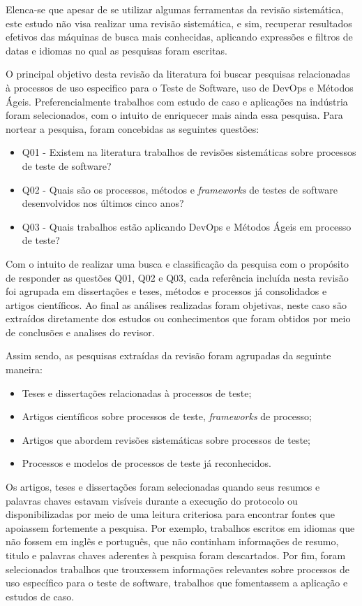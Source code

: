 Elenca-se que apesar de se utilizar algumas ferramentas da revisão sistemática, este estudo não visa realizar uma revisão sistemática, e sim, recuperar resultados efetivos das máquinas de busca mais conhecidas, aplicando expressões e filtros de datas e idiomas no qual as pesquisas foram escritas. 

O principal objetivo desta revisão da literatura foi buscar pesquisas relacionadas à processos de uso especifico para o Teste de Software, uso de DevOps e Métodos Ágeis. Preferencialmente trabalhos com estudo de caso e aplicações na indústria foram selecionados, com o intuito de enriquecer mais ainda essa pesquisa. Para nortear a pesquisa, foram concebidas as seguintes questões:

\begin{itemize}
\item Q01 - Existem na literatura trabalhos de revisões sistemáticas sobre processos de teste de software?   
\item Q02 - Quais são os processos, métodos e \textit{frameworks} de testes de software desenvolvidos nos últimos cinco anos?
\item Q03 - Quais trabalhos estão aplicando DevOps e Métodos Ágeis em processo de teste?
\end{itemize}

Com o intuito de realizar uma busca e classificação da pesquisa com o propósito de responder as questões Q01, Q02 e Q03, cada referência incluída nesta revisão foi agrupada em dissertações e teses, métodos e processos já consolidados e artigos científicos. Ao final as análises realizadas foram objetivas, neste caso são extraídos diretamente dos estudos ou conhecimentos que foram obtidos por meio de conclusões e analises do revisor.

Assim sendo, as pesquisas extraídas da revisão foram agrupadas da seguinte maneira:

\begin{itemize}
\item Teses e dissertações relacionadas à processos de teste;
\item Artigos científicos sobre processos de teste, \textit{frameworks} de processo;
\item Artigos que abordem revisões sistemáticas sobre processos de teste;
\item Processos e modelos de processos de teste já reconhecidos.
\end{itemize}

Os artigos, teses e dissertações foram selecionadas quando seus resumos e palavras chaves estavam visíveis durante a execução do protocolo ou disponibilizadas por meio de uma leitura criteriosa para encontrar fontes que apoiassem fortemente a pesquisa. Por exemplo, trabalhos escritos em idiomas que não fossem em inglês e português, que não continham informações de resumo, titulo e palavras chaves aderentes à pesquisa foram descartados. Por fim, foram selecionados trabalhos que trouxessem informações relevantes sobre processos de uso específico para o teste de software, trabalhos que fomentassem a aplicação e estudos de caso.

